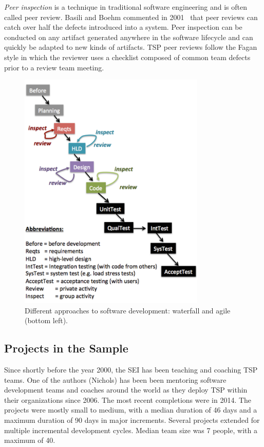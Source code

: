  
 
{\em Peer inspection} is a  technique in
traditional software engineering and is often called peer review.
 Basili and Boehm   commented in 2001~\cite{boehm01} 
that peer reviews can catch over half the defects introduced into a system.
Peer inspection can be conducted on any artifact generated anywhere in the software
lifecycle and can quickly be adapted to new kinds of artifacts. TSP peer reviews follow the Fagan style in which the reviewer uses a checklist composed of common team defects prior to a review team meeting. 


\begin{figure}[!t] 
\includegraphics[width=3.5in]{img/waterfall-v3.pdf} 
\caption{Different approaches to software development:  waterfall and agile (bottom left).}
\label{fig:waterfall}
\end{figure}


\subsection{Projects in the Sample}
Since shortly before the year 2000, the SEI has been teaching and coaching TSP teams. One of the authors (Nichols) has been been mentoring software development teams and coaches around the world as they deploy TSP within their organizations since 2006.  The  most recent completions were in 2014.
The projects were mostly small to medium, with a median duration of 46 days and a maximum duration of 90 days in major increments. 
Several projects extended for multiple incremental development cycles. 
Median team size was 7 people, with a maximum of 40. 

